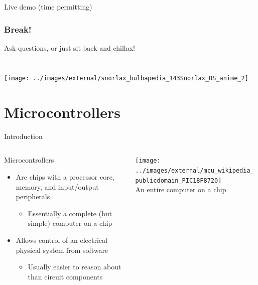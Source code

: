 \documentclass{beamer}
\begin{document}
\subsection{}
\begin{frame}{Live demo (time permitting)}
\end{frame}

\begin{frame}[plain]
\frametitle{Break!} \centering
  Ask questions, or just sit back and chillax! \\
  ~ \\
  ~ \\
  \texttt{[image: ../images/external/snorlax\_bulbapedia\_143Snorlax\_OS\_anime\_2]} 
\end{frame}

\section{Microcontrollers}
\begin{frame}{Introduction}
  \begin{columns}[T]
    \begin{column}{.6\textwidth}
      Microcontrollers
      \begin{itemize}
        \item Are chips with a processor core, memory, and input/output peripherals
        \begin{itemize}
          \item Essentially a complete (but simple) computer on a chip
        \end{itemize}
        \item Allows control of an electrical physical system from software
        \begin{itemize}
          \item Usually easier to reason about than circuit components
        \end{itemize}        
      \end{itemize}
    \end{column}

    \begin{column}{0.4\textwidth} \centering
      \texttt{[image: ../images/external/mcu\_wikipedia\_publicdomain\_PIC18F8720]} \\
      An entire computer on a chip
    \end{column}
  \end{columns}
\end{frame}
\end{document}
